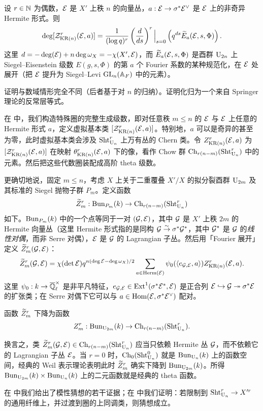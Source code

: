 \begin{thm} 设 $r\in \mathbb{N}$ 为偶数，$\mathcal{E}$ 是 $X'$ 上秩 $n$ 的向量丛，$a: \mathcal{E}\to \sigma^{*}\mathcal{E}^{\vee}$ 是 $\mathcal{E}$ 上的非奇异 Hermite 形式。则
\begin{equation*}
\deg [\mathcal{Z}_{\textup{KR}(n)}^r(\mathcal{E}, a)]=\frac{1}{(\log q)^r}  \left(\dfrac{d}{ds} \right)^r\Big|_{s=0} \left( q^{ds} \widetilde{E}_{a}(\mathcal{E},s,\Phi) \right).
\end{equation*}
这里 $d=-\deg(\mathcal{E})+n\deg\omega_X =-\chi(X',\mathcal{E})$，而 $\widetilde{E}_{a}(\mathcal{E},s,\Phi)$ 是酉群 $\textup{U}_{2n}$ 上 Siegel–Eisenstein 级数 $E(g,s,\Phi)$ 的第 $a$ 个 Fourier 系数的某种规范化，在 $\mathcal{E}$ 处展开（把 $\mathcal{E}$ 提升为 Siegel–Levi $\textup{GL}_{n}(\mathbb{A}_{F})$ 中的元素）。
\end{thm}

证明与数域情形完全不同（后者基于对 $n$ 的归纳）。证明化归为一个来自 Springer 理论的反常层等式。

在 \cite{FYZ2} 中，我们构造特殊圈的完整生成级数，即对任意秩 $m\le n$ 的 $\mathcal{E}$ 与 $\mathcal{E}$ 上任意的 Hermite 形式 $a$，定义虚拟基本类 $[\mathcal{Z}_{\textup{KR}(n)}^r(\mathcal{E}, a)]$。特别地，$a$ 可以是奇异的甚至为零，此时虚拟基本类会涉及 $\textup{Sht}^{r}_{\textup{U}_{n}}$ 上万有丛的 Chern 类。令 $Z_{\textup{KR}(n)}^{r}(\mathcal{E},a)$ 为 $[\mathcal{Z}_{\textup{KR}(n)}^r(\mathcal{E}, a)]$ 在映射 $\theta^{r}_{\textup{KR}(n)}(\mathcal{E},a)$ 下的像，看作 Chow 群 $\textup{Ch}_{r(n-m)}(\textup{Sht}^{r}_{\textup{U}_{n}})$ 中的元素。然后把这些代数圈装配成高阶 theta 级数。

更确切地说，固定 $m\le n$，考虑 $X$ 上关于二重覆叠 $X'/X$ 的拟分裂酉群 $\textup{U}_{2m}$ 及其标准的 Siegel 抛物子群 $P_m$。定义函数
\begin{equation*}
\widetilde{Z}^{r}_{m}: \textup{Bun}_{P_{m}}(k)\to \textup{Ch}_{r(n-m)}(\textup{Sht}^{r}_{\textup{U}_{n}})
\end{equation*}
如下。$\textup{Bun}_{P_{m}}(k)$ 中的一个点等同于一对 $(\mathcal{G},\mathcal{E})$，其中 $\mathcal{G}$ 是 $X'$ 上秩 $2m$ 的 Hermite 向量丛（这里 Hermite 形式指的是同构 $\mathcal{G}\stackrel{\sim}{\to} \sigma^{*}\mathcal{G}^{*}$，其中 $\mathcal{G}^{*}$ 是 $\mathcal{G}$ 的\emph{线性对偶}，而非 Serre 对偶），$\mathcal{E}$ 是 $\mathcal{G}$ 的 Lagrangian 子丛。然后用「Fourier 展开」定义 $\widetilde{Z}^{r}_{m}(\mathcal{G},\mathcal{E})$：
\begin{equation*}
\widetilde{Z}^{r}_{m}(\mathcal{G},\mathcal{E}) =\chi(\det\mathcal{E})q^{n(\deg \mathcal{E}-\deg\omega_{X}) /2}\sum_{a\in \textup{Herm}(\mathcal{E})}\psi_{0}(\langle{e_{\mathcal{G},\mathcal{E}}, a}\rangle)Z^{ r}_{\textup{KR}(n)}(\mathcal{E}, a).
\end{equation*}
这里 $\psi_{0}:k\to \overline{\mathbb{Q}}_\ell^{\times}$ 是非平凡特征，$e_{\mathcal{G},\mathcal{E}}\in \textup{Ext}^{1}(\sigma^{*}\mathcal{E}^{*}, \mathcal{E})$ 是正合列 $\mathcal{E}\hookrightarrow \mathcal{G}\twoheadrightarrow \sigma^{*}\mathcal{E}$ 的扩张类；在 Serre 对偶下它可以与 $a\in \textup{Hom}(\mathcal{E},\sigma^{*}\mathcal{E}^{\vee})$ 配对。

\begin{conj} 函数 $\widetilde{Z}^{r}_{m}$ 下降为函数
\begin{equation*}
Z^{r}_{m}:\textup{Bun}_{\textup{U}_{2m}}(k)\to \textup{Ch}_{r(n-m)}(\textup{Sht}^{r}_{\textup{U}_{n}}).
\end{equation*}
\end{conj}
换言之，类 $\widetilde{Z}^{r}_{m}(\mathcal{G},\mathcal{E})\in \textup{Ch}_{r(n-m)}(\textup{Sht}^{r}_{\textup{U}_{n}})$ 应当只依赖 Hermite 丛 $\mathcal{G}$，而不依赖它的 Lagrangian 子丛 $\mathcal{E}$。当 $r=0$ 时，$\textup{Ch}_{0}(\textup{Sht}^{0}_{\textup{U}_{n}})$ 就是 $\textup{Bun}_{\textup{U}_{n}}(k)$ 上的函数空间，经典的 Weil 表示理论表明此时 $\widetilde{Z}^{r}_{m}$ 确实下降到 $\textup{Bun}_{\textup{U}_{2m}}(k)$。所得 $\textup{Bun}_{\textup{U}_{2m}}(k)\times \textup{Bun}_{\textup{U}_{n}}(k)$ 上的二元函数就是经典的 theta 函数。

在 \cite{FYZ2} 中我们给出了模性猜想的若干证据；在 \cite{FYZ3} 中我们证明：若限制到 $\textup{Sht}^{r}_{\textup{U}_{n}}\to X'^{r}$ 的通用纤维上，并过渡到圈的上同调类，则猜想成立。
